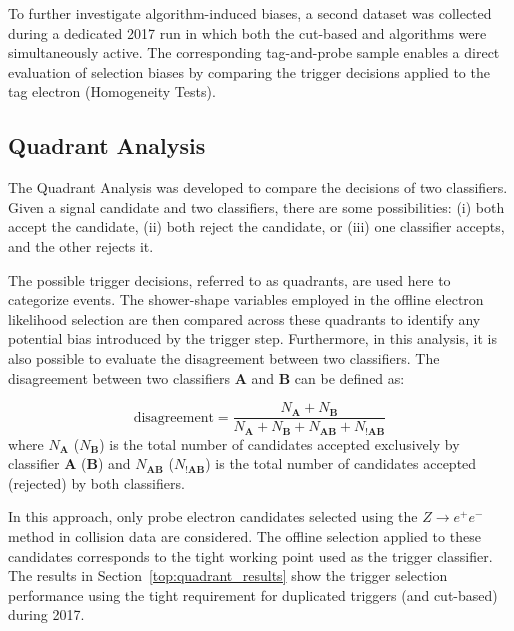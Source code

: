 To further investigate algorithm-induced biases, a second dataset was collected during a dedicated 2017 run in which both the cut-based and \rnn{} algorithms were simultaneously active. The corresponding tag-and-probe sample enables a direct evaluation of selection biases by comparing the trigger decisions applied to the tag electron (Homogeneity Tests).


\subsection{Quadrant Analysis}\label{ssec:quadrant}

The Quadrant Analysis was developed to compare the decisions of two classifiers. Given a signal candidate and two classifiers, there are some possibilities: (i) both accept the candidate, (ii) both reject the candidate, or (iii) one classifier accepts, and the other rejects it. 

The possible trigger decisions, referred to as quadrants, are used here to categorize events. The shower-shape variables employed in the offline electron likelihood selection are then compared across these quadrants to identify any potential bias introduced by the trigger step. Furthermore, in this analysis, it is also possible to evaluate the disagreement between two classifiers. The disagreement between two classifiers $\textbf{A}$ and $\textbf{B}$ can be defined as:

\begin{equation}
    \text{disagreement} = \frac{N_{\textbf{A}}+N_{\textbf{B}}}{N_{\textbf{A}}+N_{\textbf{B}}+N_{\textbf{AB}}+N_{!\textbf{AB}}}
    \label{eq:disagreement}
\end{equation}
where $N_{\textbf{A}}$ ($N_{\textbf{B}}$) is the total number of candidates accepted exclusively by classifier $\textbf{A}$ ($\textbf{B}$) and $N_{\textbf{AB}}$ ($N_{\textbf{!AB}}$) is the total number of candidates accepted (rejected) by both classifiers.


In this approach, only probe electron candidates selected using the $Z\rightarrow e^+e^-$ \tnp method in collision data are considered. The offline selection applied to these candidates corresponds to the tight working point used as the trigger classifier. The results in Section~\ref{top:quadrant_results} show the trigger selection performance using the tight requirement for duplicated triggers (\rnn and cut-based) during 2017.


